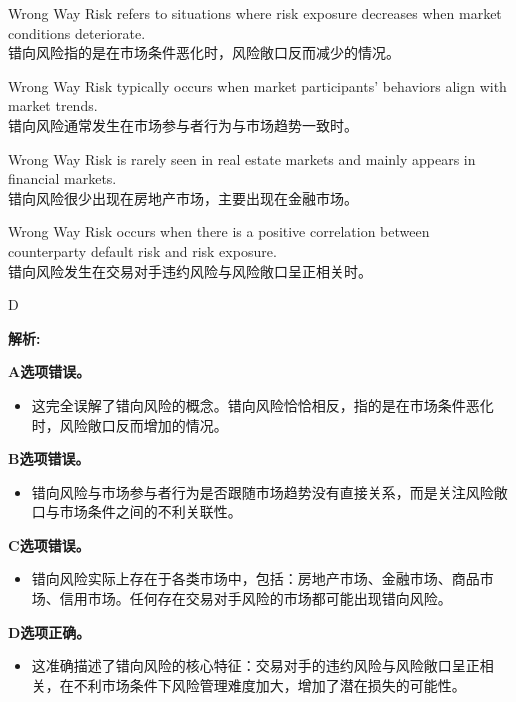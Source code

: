 \documentclass{article}
\newenvironment{explanation}
{\textbf{解析:}\par}
{\par}
\begin{document}
    \begin{choices}
    \item Wrong Way Risk refers to situations where risk exposure decreases when market conditions deteriorate. \\
    错向风险指的是在市场条件恶化时，风险敞口反而减少的情况。
    \item Wrong Way Risk typically occurs when market participants' behaviors align with market trends. \\
    错向风险通常发生在市场参与者行为与市场趋势一致时。
    \item Wrong Way Risk is rarely seen in real estate markets and mainly appears in financial markets. \\
    错向风险很少出现在房地产市场，主要出现在金融市场。
    \item Wrong Way Risk occurs when there is a positive correlation between counterparty default risk and risk exposure. \\
    错向风险发生在交易对手违约风险与风险敞口呈正相关时。
    \end{choices}
    
    \begin{correctanswer}
    D
    \end{correctanswer}
    
    \begin{explanation}
    \textbf{A选项错误。}
    \begin{itemize}
        \item 这完全误解了错向风险的概念。错向风险恰恰相反，指的是在市场条件恶化时，风险敞口反而增加的情况。
    \end{itemize}
    
    \textbf{B选项错误。}
    \begin{itemize}
        \item 错向风险与市场参与者行为是否跟随市场趋势没有直接关系，而是关注风险敞口与市场条件之间的不利关联性。
    \end{itemize}
    
    \textbf{C选项错误。}
    \begin{itemize}
        \item 错向风险实际上存在于各类市场中，包括：房地产市场、金融市场、商品市场、信用市场。任何存在交易对手风险的市场都可能出现错向风险。
    \end{itemize}
    
    \textbf{D选项正确。}
    \begin{itemize}
        \item 这准确描述了错向风险的核心特征：交易对手的违约风险与风险敞口呈正相关，在不利市场条件下风险管理难度加大，增加了潜在损失的可能性。
    \end{itemize}

    \end{explanation}
\end{document}
